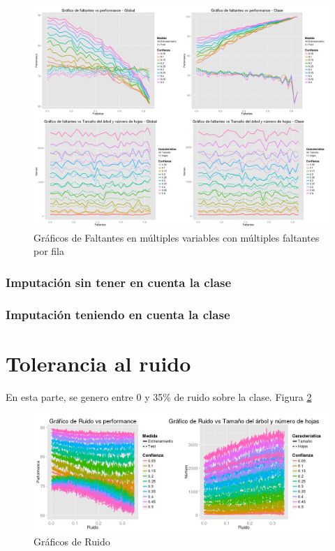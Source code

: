 \documentclass[]{article}
\begin{document}
\begin{figure}[H]
	\includegraphics[scale = 0.27]{2_1_Mult_Col_Mult_Fil}
	\caption[[Faltantes Múltiples variables Múltiples Filas]{Gráficos de Faltantes en múltiples variables con múltiples faltantes por fila}
	\label{1.P2MultVarMultFil}
\end{figure}

\subsubsection{Imputación sin tener en cuenta la clase}

\subsubsection{Imputación teniendo en cuenta la clase}

\section{Tolerancia al ruido}
En esta parte, se genero entre 0 y 35\% de ruido sobre la clase. Figura \ref{3.P3Ruido}

\begin{figure}[H]
	\includegraphics[scale = 0.4]{3_1_Ruido}
	\caption[Ruido]{Gráficos de Ruido}
	\label{3.P3Ruido}
\end{figure}
\end{document}

